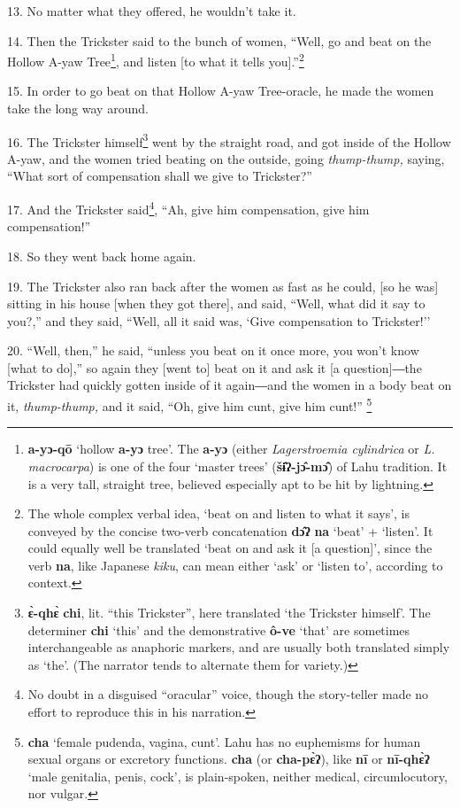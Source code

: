 13. No matter what they offered, he wouldn't take it.

14. Then the Trickster said to the bunch of women, ``Well, go and beat on the Hollow
A-yaw Tree\footnote{\textbf{a-yɔ-qō} `hollow \textbf{a-yɔ} tree'. The \textbf{a-yɔ} (either \textit{Lagerstroemia cylindrica }or \textit{L. macrocarpa}) is one of the four `master trees' (\textbf{šɨ̂ʔ-jɔ̂-mɔ̂}) of Lahu tradition. It is a very tall, straight tree, believed especially apt to be hit by lightning.}, and listen [to what it tells you].''\footnote{The whole complex verbal idea, `beat on and listen to what it says', is conveyed by the concise two-verb concatenation \textbf{dɔ̂ʔ} \textbf{na} `beat' + `listen'. It could equally well be translated `beat on and ask it [a question]', since the verb \textbf{na}, like Japanese \textit{kiku}, can mean either `ask' or `listen to', according to context.}

15. In order to go beat on that Hollow A-yaw Tree-oracle, he made the women take
the long way around.

16. The Trickster himself\footnote{\textbf{ɛ̀-qhɛ̀} \textbf{chi}, lit. ``this Trickster'', here translated `the Trickster himself'. The determiner \textbf{chi} `this' and the demonstrative \textbf{ô-ve} `that' are sometimes interchangeable as anaphoric markers, and are usually both translated simply as `the'. (The narrator tends to alternate them for variety.)} went by the straight road, and got inside of the
Hollow A-yaw, and the women tried beating on the outside, going \textit{thump-thump,
}saying, ``What sort of compensation shall we give to Trickster?''

17. And the Trickster said\footnote{No doubt in a disguised ``oracular'' voice, though the story-teller made no effort to reproduce this in his narration.}, ``Ah, give him compensation, give him compensation!''

18. So they went back home again.

19. The Trickster also ran back after the women as fast as he could, [so he was]
sitting in his house [when they got there], and said, ``Well, what did it say to
you?,'' and they said, ``Well, all it said was, `Give compensation to Trickster!''

20. ``Well, then,'' he said, ``unless you beat on it once more, you won't know
[what to do],'' so again they [went to] beat on it and ask it [a question]―the
Trickster had quickly gotten inside of it again―and the women in a body beat
on it,\textit{ thump-thump, }and it said, ``Oh, give him cunt, give him cunt!''
\footnote{\textbf{cha} `female pudenda, vagina, cunt'. Lahu has no euphemisms for human sexual organs or excretory functions. \textbf{cha} (or \textbf{cha-pɛ̀ʔ}), like \textbf{nī} or \textbf{nī-qhɛ̀ʔ} `male genitalia, penis, cock', is plain-spoken, neither medical, circumlocutory, nor vulgar.}

